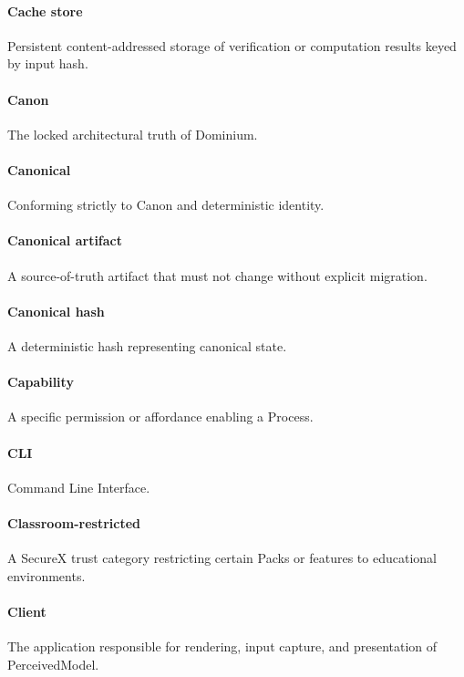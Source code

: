 \documentclass[9pt,a4paper,openany]{book}
\begin{document}
\paragraph{Cache store}
Persistent content-\allowbreak{}addressed storage of verification or computation results keyed by input hash.\allowbreak{}


\paragraph{Canon}
The locked architectural truth of Dominium.\allowbreak{}


\paragraph{Canonical}
Conforming strictly to Canon and deterministic identity.\allowbreak{}


\paragraph{Canonical artifact}
A source-\allowbreak{}of-\allowbreak{}truth artifact that must not change without explicit migration.\allowbreak{}


\paragraph{Canonical hash}
A deterministic hash representing canonical state.\allowbreak{}


\paragraph{Capability}
A specific permission or affordance enabling a Process.\allowbreak{}


\paragraph{CLI}
Command Line Interface.\allowbreak{}


\paragraph{Classroom-restricted}
A SecureX trust category restricting certain Packs or features to educational environments.\allowbreak{}


\paragraph{Client}
The application responsible for rendering, input capture, and presentation of PerceivedModel.\allowbreak{}
\end{document}
